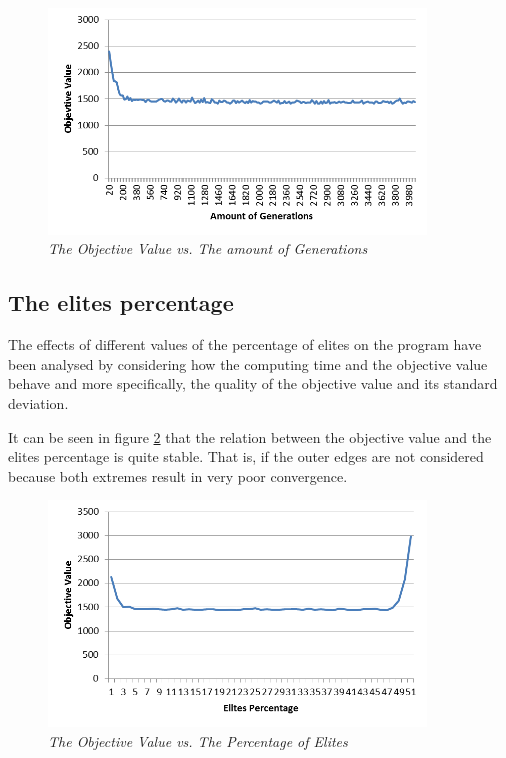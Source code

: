 \begin{figure}[H] 
	\centering
	\includegraphics[height=6cm]{OVG}
	\caption{\textsl{The Objective Value vs. The amount of Generations}}
	\label{OVG}
\end{figure}



\subsection{The elites percentage}

\par
The effects of different values of the percentage of elites on the program have been analysed by considering how the computing time and the objective value behave and more specifically, the quality of the objective value and its standard deviation.

It can be seen in figure \ref{OVEP}  that the relation between the objective value and the elites percentage is quite stable. That is, if the outer edges are not considered because both extremes result in very poor convergence.

	\begin{figure}[h] 
		\centering
		\includegraphics[height=6cm]{OVEP}
		\caption{\textsl{The Objective Value vs. The Percentage of Elites}}
		\label{OVEP}
	\end{figure}
	

